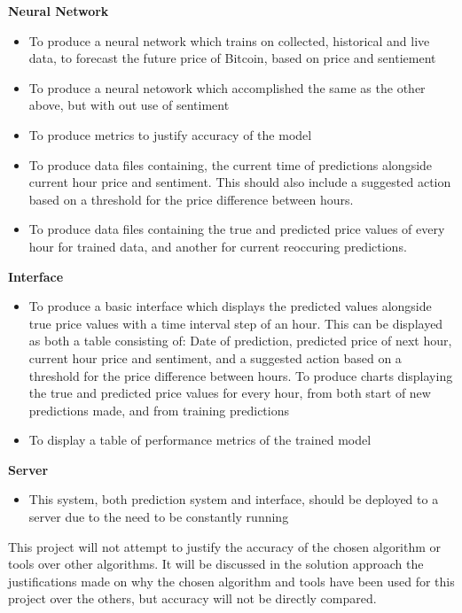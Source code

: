 \documentclass[oneside, 12pt]{article}
\begin{document}
		\textbf{Neural Network}
		\begin{itemize}
			\item To produce a neural network which trains on collected, historical and live data, to forecast the future price of Bitcoin, based on price and sentiement
			\item To produce a neural netowork which accomplished the same as the other above, but with out use of sentiment
			\item To produce metrics to justify accuracy of the model
			\item To produce data files containing, the current time of predictions alongside current hour price and sentiment. This should also include a suggested action based on a threshold for the price difference between hours. 
			\item To produce data files containing the true and predicted price values of every hour for trained data, and another for current reoccuring predictions.
			\newline
		\end{itemize}
		
		\textbf{Interface}
		\begin{itemize}
			\item To produce a basic interface which displays the predicted values alongside true price values with a time interval step of an hour. This can be displayed as both a table consisting of: 
			\subitem Date of prediction, predicted price of next hour, current hour price and sentiment, and a suggested action based on a threshold for the price difference between hours.
			\subitem To produce charts displaying the true and predicted price values for every hour, from both start of new predictions made, and from training predictions
			\item To display a table of performance metrics of the trained model
			\newline
		\end{itemize}
	
		\textbf{Server}
		\begin{itemize}
			\item This system, both prediction system and interface, should be deployed to a server due to the need to be constantly running
		\end{itemize}
		
		This project will not attempt to justify the accuracy of the chosen algorithm or tools over other algorithms. It will be discussed in the solution approach the justifications made on why the chosen algorithm and tools have been used for this project over the others, but accuracy will not be directly compared.
		
\end{document}
